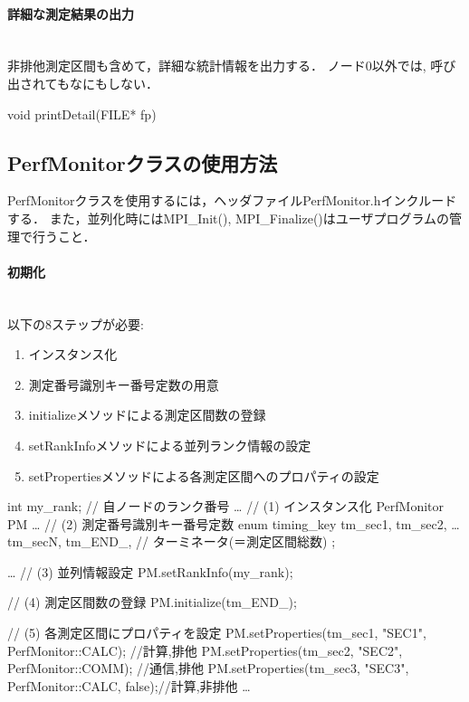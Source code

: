 \paragraph{詳細な測定結果の出力}\mbox{}\\
非排他測定区間も含めて，詳細な統計情報を出力する．
ノード0以外では, 呼び出されてもなにもしない．
{\small
\begin{program}
void printDetail(FILE* fp)
\end{program}
}

%
\subsection{PerfMonitorクラスの使用方法}
PerfMonitorクラスを使用するには，ヘッダファイルPerfMonitor.hインクルードする．
また，並列化時にはMPI\_Init(), MPI\_Finalize()はユーザプログラムの管理で行うこと．

\paragraph{初期化}\mbox{}\\
以下の8ステップが必要:
\begin{enumerate}
\item インスタンス化
\item 測定番号識別キー番号定数の用意
\item initializeメソッドによる測定区間数の登録
\item setRankInfoメソッドによる並列ランク情報の設定
\item setPropertiesメソッドによる各測定区間へのプロパティの設定
\end{enumerate}

{\small
\begin{program}

  int my_rank; // 自ノードのランク番号
  …
  // (1) インスタンス化
  PerfMonitor PM
  …
  // (2) 測定番号識別キー番号定数
  enum timing_key {
    tm_sec1,
    tm_sec2,
    … 
    tm_secN,
    tm_END_,   // ターミネータ(＝測定区間総数)
  };

  …
  // (3) 並列情報設定
  PM.setRankInfo(my_rank);

  // (4) 測定区間数の登録
  PM.initialize(tm_END_);

  // (5) 各測定区間にプロパティを設定
  PM.setProperties(tm_sec1, "SEC1", PerfMonitor::CALC);       //計算,排他
  PM.setProperties(tm_sec2, "SEC2", PerfMonitor::COMM);       //通信,排他
  PM.setProperties(tm_sec3, "SEC3", PerfMonitor::CALC, false);//計算,非排他
  …
\end{program}
}

